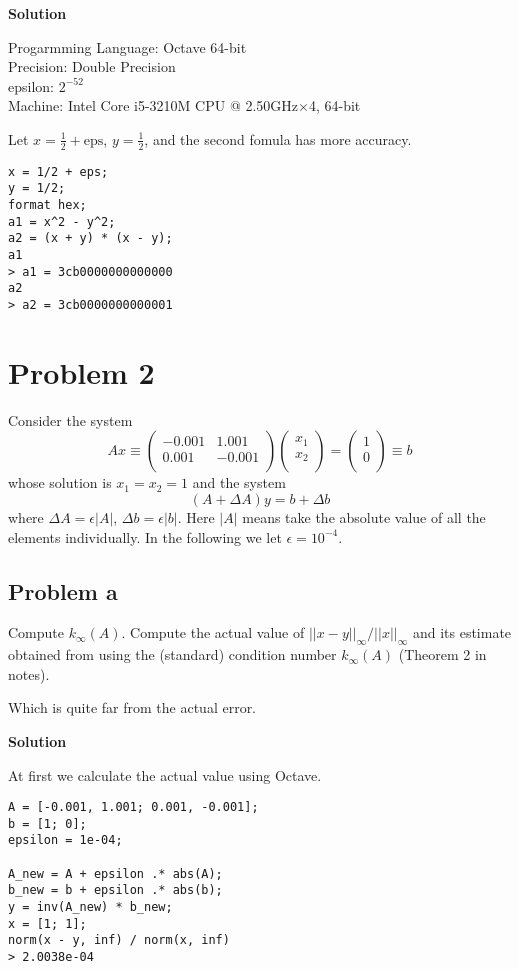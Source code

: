 \documentclass[12pt,oneside,a4paper]{article}
\newcommand{\problem}[1]
{
    \clearpage
    \section*{Problem {#1}}
}
\newcommand{\subproblem}[1]
{
    \subsection*{Problem {#1}}
}
\newcommand{\solution}
{
    \vspace{15pt}
    \noindent\ignorespaces\textbf{\large Solution}\par
}
\begin{document}
\solution

Progarmming Language: Octave 64-bit\\
Precision: Double Precision\\
epsilon: $2^{-52}$\\
Machine: Intel Core i5-3210M CPU @ 2.50GHz$\times$4, 64-bit\par

Let $x = \frac{1}{2} + \mathrm{eps}$, $y = \frac{1}{2}$, and the second fomula has more accuracy.

\begin{verbatim}
x = 1/2 + eps;
y = 1/2;
format hex;
a1 = x^2 - y^2;
a2 = (x + y) * (x - y);
a1
> a1 = 3cb0000000000000
a2
> a2 = 3cb0000000000001
\end{verbatim}

\problem{2}
Consider the system
$$Ax \equiv \begin{pmatrix}
  -0.001 & 1.001\\
  0.001  & -0.001\\
 \end{pmatrix} \begin{pmatrix}
  x_{1}\\
  x_{2}\\
 \end{pmatrix} = \begin{pmatrix}
  1\\
  0\\
 \end{pmatrix} \equiv b$$
whose solution is $x_{1} = x_{2} = 1$ and the system 
$$(A + \Delta A)y = b + \Delta b$$
where $\Delta A = \epsilon |A|$, $\Delta b = \epsilon |b|$. Here $|A|$ means take the absolute value of all the elements individually. In the following we let $\epsilon = 10^{-4}$.

\subproblem{a}
Compute $k_{\infty}(A)$. Compute the actual value of $||x-y||_{\infty} / ||x||_{\infty}$ and its estimate obtained from using the (standard) condition number $k_{\infty}(A)$ (Theorem 2 in notes).\par
Which is quite far from the actual error.

\solution
At first we calculate the actual value using Octave.

\begin{verbatim}
A = [-0.001, 1.001; 0.001, -0.001];
b = [1; 0];
epsilon = 1e-04;

A_new = A + epsilon .* abs(A);
b_new = b + epsilon .* abs(b);
y = inv(A_new) * b_new;
x = [1; 1];
norm(x - y, inf) / norm(x, inf)
> 2.0038e-04
\end{verbatim}
\end{document}
